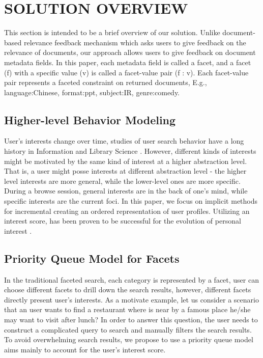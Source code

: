 \chapter{SOLUTION OVERVIEW}
This section is intended to be a brief overview of our solution. Unlike document-based relevance feedback mechanism which asks users to give feedback on the relevance of documents, our approach allows users to give feedback on document metadata fields. In this paper, each metadata field is called a facet, and a facet (f) with a specific value (v) is called a facet-value pair (f : v). Each facet-value pair represents a faceted constraint on returned documents, E.g., language:Chinese, format:ppt, subject:IR, genre:comedy.

\section{Higher-level Behavior Modeling}
User's interests change over time, studies of user search behavior have a long history in Information and Library Science \cite{Bates1979}\cite{Rose}\cite{Spink2002}. However, different kinds of interests might be motivated by the same kind of interest at a higher abstraction level. That is, a user might posse interests at different abstraction level - the higher level interests are more general, while the lower-level ones are more specific. During a browse session, general interests are in the back of one's mind, while specific interests are the current foci. In this paper, we focus on implicit methods for incremental creating an ordered representation of user profiles. Utilizing an interest score, has been proven to be successful for the evolution of personal interest \cite{Sieg2007}. 

\section{Priority Queue Model for Facets}
In the traditional faceted search, each category is represented by a facet, user can choose different facets to drill down the search results, however, different facets directly present user's interests. As a motivate example, let us consider a scenario that an user wants to find a restaurant where is near by a famous place he/she may want to visit after lunch? In order to answer this question, the user needs to construct a complicated query to search and manually filters the search results. To avoid overwhelming search results, we propose to use a priority queue model aims mainly to account for the user's interest score. 
  
